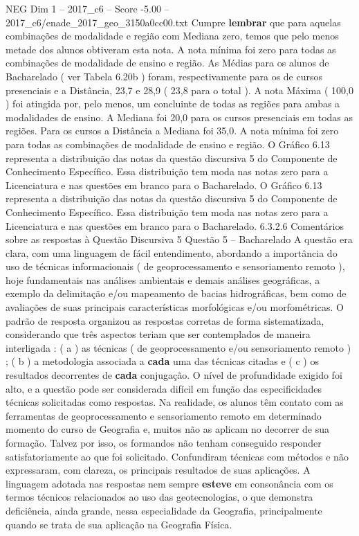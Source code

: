 \begin{textsample}{NEG Dim 1 – 2017\_c6 – Score -5.00 – 2017\_c6/enade\_2017\_geo\_3150a0cc00.txt}
Cumpre \textbf{lembrar} que para aquelas combinações de modalidade e região com Mediana zero, temos que pelo menos metade dos alunos obtiveram esta nota.
A nota mínima foi zero para todas as combinações de modalidade de ensino e região.
As Médias para os alunos de Bacharelado ( ver Tabela 6.20b ) foram, respectivamente para os de cursos presenciais e a Distância, 23,7 e 28,9 ( 23,8 para o total ).
A nota Máxima ( 100,0 ) foi atingida por, pelo menos, um concluinte de todas as regiões para ambas a modalidades de ensino.
A Mediana foi 20,0 para os cursos presenciais em todas as regiões.
Para os cursos a Distância a Mediana foi 35,0.
A nota mínima foi zero para todas as combinações de modalidade de ensino e região.
O Gráfico 6.13 representa a distribuição das notas da questão discursiva 5 do Componente de Conhecimento Específico.
Essa distribuição tem moda nas notas zero para a Licenciatura e nas questões em branco para o Bacharelado.
O Gráfico 6.13 representa a distribuição das notas da questão discursiva 5 do Componente de Conhecimento Específico.
Essa distribuição tem moda nas notas zero para a Licenciatura e nas questões em branco para o Bacharelado. 6.3.2.6 Comentários sobre as respostas à Questão Discursiva 5 Questão 5 – Bacharelado A questão era clara, com uma linguagem de fácil entendimento, abordando a importância do uso de técnicas informacionais ( de geoprocessamento e sensoriamento remoto ), hoje fundamentais nas análises ambientais e demais análises geográficas, a exemplo da delimitação e/ou mapeamento de bacias hidrográficas, bem como de avaliações de suas principais características morfológicas e/ou morfométricas.
O padrão de resposta organizou as respostas corretas de forma sistematizada, considerando que três aspectos teriam que ser contemplados de maneira interligada : ( a ) as técnicas ( de geoprocessamento e/ou sensoriamento remoto ) ; ( b ) a metodologia associada a \textbf{cada} uma das técnicas citadas e ( c ) os resultados decorrentes de \textbf{cada} conjugação.
O nível de profundidade exigido foi alto, e a questão pode ser considerada difícil em função das especificidades técnicas solicitadas como respostas.
Na realidade, os alunos têm contato com as ferramentas de geoprocessamento e sensoriamento remoto em determinado momento do curso de Geografia e, muitos não as aplicam no decorrer de sua formação.
Talvez por isso, os formandos não tenham conseguido responder satisfatoriamente ao que foi solicitado.
Confundiram técnicas com métodos e não expressaram, com clareza, os principais resultados de suas aplicações.
A linguagem adotada nas respostas nem sempre \textbf{esteve} em consonância com os termos técnicos relacionados ao uso das geotecnologias, o que demonstra deficiência, ainda grande, nessa especialidade da Geografia, principalmente quando se trata de sua aplicação na Geografia Física.

\end{textsample}
